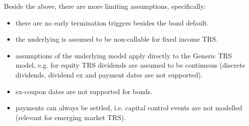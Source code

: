 \smallskip

Beside the above, there are more limiting assumptions, specifically:
\begin{itemize}
\item there are no early termination triggers besides the bond default.
\item the underlying is assumed to be non-callable for fixed income TRS.
\item assumptions of the underlying model apply directly to the Generic TRS model, e.g. for equity TRS dividends are assumed to be
continuous (discrete dividends, dividend ex and payment dates are not supported).
\item ex-coupon dates are not supported for bonds.
\item payments can always be settled, i.e. capital control events are not modelled (relevant for emerging market TRS).
\end{itemize}